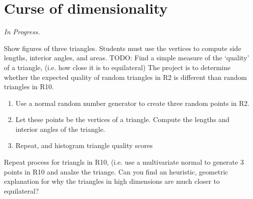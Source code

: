 \section{Curse of dimensionality}

\textit{In Progress.}

Show figures of three triangles. Students must use the vertices to compute side lengths, interior angles, and areas.  TODO: Find a simple measure of the `quality' of a triangle, (i.e. how close it is to equilateral)
The project is to determine whether the expected quality of random triangles in R2  is different than random triangles in R10. 
\begin{enumerate}
  \item Use a normal random number generator to create three random points in R2.
  \item Let these points be the vertices of a triangle. Compute the lengths and interior angles of the triangle.
  \item Repeat, and histogram triangle quality scores
\end{enumerate}

Repeat process for triangls in R10, (i.e. use a multivariate normal to generate 3 points in R10 and analze the triange.
Can you find an heuristic, geometric explanation for why the triangles in high dimensions are much closer to equilateral?
